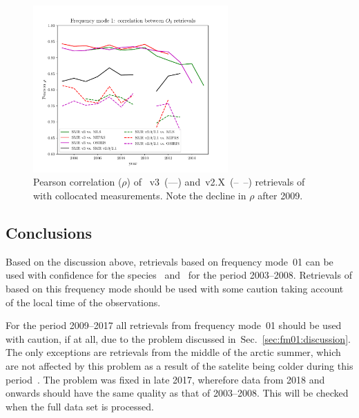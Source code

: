 \begin{figure}[ht]
    \centering
    \includegraphics[width=0.666\textwidth]{../DDS/figures/DDS_fm1_O3_corr}
    \caption{Pearson correlation ($\rho$) of \smr~v3~(---) and~v2.X~(--~--)
    retrievals of  with collocated measurements. Note the decline in
    $\rho$ after 2009.}
    \label{fig:fm01:O3:corr}
\end{figure}


\subsection{Conclusions}
\label{sec:fm01:conclusions}
Based on the discussion above, retrievals based on frequency mode~01 can be
used with confidence for the species~ and~ for the
period 2003--2008. Retrievals of  based on this frequency mode
should be used with some caution taking account of the local time of the
observations.

For the period 2009--2017  all retrievals from frequency mode~01 should be used
with  caution, if at all, due to the problem discussed
in~Sec.~\ref{sec:fm01:discussion}. The only exceptions are retrievals from the
middle of the arctic summer, which are not affected by this problem as a result
of the satelite being colder during this period~\cite{postlaunch:2006}. The
problem was fixed in late 2017, wherefore data from 2018 and onwards should
have the same quality as that of 2003--2008. This will be checked when the full
data set is processed.
